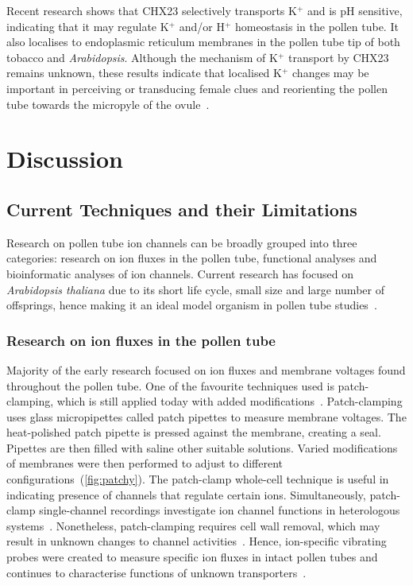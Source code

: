 \documentclass[11pt]{article}
\begin{document}
\begin{multicols*}{2}
Recent research shows that CHX23 selectively transports K$^{+}$ and is pH sensitive, indicating that it may regulate K$^{+}$ and/or H$^{+}$ homeostasis in the pollen tube. It also localises to endoplasmic reticulum  membranes in the pollen tube tip of both tobacco and \textit{Arabidopsis}. Although the mechanism of K$^{+}$ transport by CHX23 remains unknown, these results indicate that localised K$^{+}$ changes may be important in perceiving or transducing female clues and reorienting the pollen tube towards the micropyle of the ovule~\citep{Lu2011}. 

\section{Discussion}
\subsection{Current Techniques and their Limitations}
Research on pollen tube ion channels can be broadly grouped into three categories: research on ion fluxes in the pollen tube, functional analyses and bioinformatic analyses of ion channels. Current research has focused on \textit{Arabidopsis thaliana} due to its short life cycle, small size and large number of offsprings, hence making it an ideal model organism in pollen tube studies~\citep{Arabidopsis2000}. 

\subsubsection{Research on ion fluxes in the pollen tube}
Majority of the early research focused on ion fluxes and membrane voltages found throughout the pollen tube. One of the favourite techniques used is patch-clamping, which is still applied today with added modifications~\citep{Chen2009}. Patch-clamping uses glass micropipettes called patch pipettes to measure membrane voltages. The heat-polished patch pipette is pressed against the membrane, creating a seal. Pipettes are then filled with saline other suitable solutions. Varied modifications of membranes were then performed to adjust to different configurations~(\autoref{fig:patchy})\citep{Sakmann1984}. 
\newline\newline
The patch-clamp whole-cell technique is useful in indicating presence of channels that regulate certain ions. Simultaneously, patch-clamp single-channel recordings investigate ion channel functions in heterologous systems~\citep{Hedrich2012}. Nonetheless, patch-clamping requires cell wall removal, which may result in unknown changes to channel activities~\citep{Dutta2004}. Hence, ion-specific vibrating probes were created to measure specific ion fluxes in intact pollen tubes and continues to characterise functions of unknown transporters~\citep{Kunkel2006}.


\end{multicols*}
\end{document}
